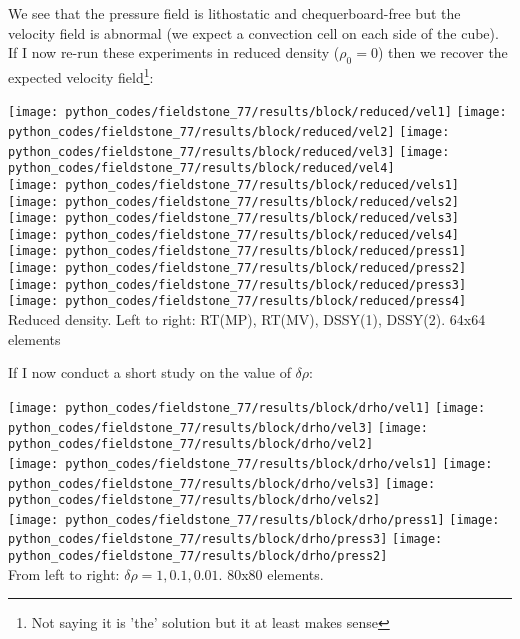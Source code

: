 We see that the pressure field is lithostatic and chequerboard-free  but the velocity field is abnormal 
(we expect a convection cell on each side of the cube).
If I now re-run these experiments in reduced density ($\rho_0=0$) then we recover
the expected velocity field\footnote{Not saying it is 'the' solution but it at least makes sense}:

\begin{center}
\texttt{[image: python\_codes/fieldstone\_77/results/block/reduced/vel1]}
\texttt{[image: python\_codes/fieldstone\_77/results/block/reduced/vel2]}
\texttt{[image: python\_codes/fieldstone\_77/results/block/reduced/vel3]}
\texttt{[image: python\_codes/fieldstone\_77/results/block/reduced/vel4]}\\
\texttt{[image: python\_codes/fieldstone\_77/results/block/reduced/vels1]}
\texttt{[image: python\_codes/fieldstone\_77/results/block/reduced/vels2]}
\texttt{[image: python\_codes/fieldstone\_77/results/block/reduced/vels3]}
\texttt{[image: python\_codes/fieldstone\_77/results/block/reduced/vels4]}\\
\texttt{[image: python\_codes/fieldstone\_77/results/block/reduced/press1]}
\texttt{[image: python\_codes/fieldstone\_77/results/block/reduced/press2]}
\texttt{[image: python\_codes/fieldstone\_77/results/block/reduced/press3]}
\texttt{[image: python\_codes/fieldstone\_77/results/block/reduced/press4]}\\
{\captionfont Reduced density. Left to right: RT(MP), RT(MV), DSSY(1), DSSY(2). 64x64 elements}
\end{center}


If I now conduct a short study on the value of $\delta\rho$:

\begin{center}
\texttt{[image: python\_codes/fieldstone\_77/results/block/drho/vel1]}
\texttt{[image: python\_codes/fieldstone\_77/results/block/drho/vel3]}
\texttt{[image: python\_codes/fieldstone\_77/results/block/drho/vel2]}\\
\texttt{[image: python\_codes/fieldstone\_77/results/block/drho/vels1]}
\texttt{[image: python\_codes/fieldstone\_77/results/block/drho/vels3]}
\texttt{[image: python\_codes/fieldstone\_77/results/block/drho/vels2]}\\
\texttt{[image: python\_codes/fieldstone\_77/results/block/drho/press1]}
\texttt{[image: python\_codes/fieldstone\_77/results/block/drho/press3]}
\texttt{[image: python\_codes/fieldstone\_77/results/block/drho/press2]}\\
{\captionfont From left to right: $\delta \rho=1,0.1,0.01$. 80x80 elements.}
\end{center}

